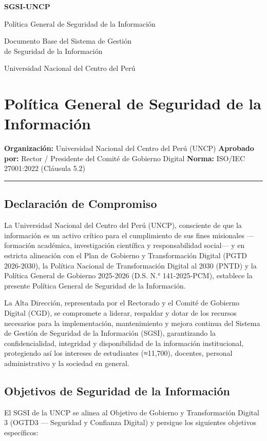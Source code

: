 \documentclass[10pt,letterpaper]{article}
\newcommand{\makecover}{
\begin{titlepage}
\centering
\vspace*{2cm}
{\Huge\bfseries\color{uncpblue} SGSI-UNCP\par}
\vspace{0.7cm}
{\LARGE Política General de Seguridad de la Información\par}
\vspace{0.5cm}
{\large Documento Base del Sistema de Gestión\\de Seguridad de la Información\par}
\vspace{1.5cm}
{\small Universidad Nacional del Centro del Perú\par}
\vfill
\end{titlepage}
}
\begin{document}
\makecover
\setcounter{tocdepth}{2}
\RaggedRight
\tableofcontents
\newpage

\RaggedRight
\section{Política General de Seguridad de la
Información}\label{poluxedtica-general-de-seguridad-de-la-informaciuxf3n}

\textbf{Organización:} Universidad Nacional del Centro del Perú (UNCP)
\textbf{Aprobado por:} Rector / Presidente del Comité de Gobierno
Digital \textbf{Norma:} ISO/IEC 27001:2022 (Cláusula 5.2)

\begin{center}\rule{0.5\linewidth}{0.5pt}\end{center}

\subsection{Declaración de
Compromiso}\label{declaraciuxf3n-de-compromiso}

La Universidad Nacional del Centro del Perú (UNCP), consciente de que la
información es un activo crítico para el cumplimiento de sus fines
misionales ---formación académica, investigación científica y
responsabilidad social--- y en estricta alineación con el Plan de
Gobierno y Transformación Digital (PGTD 2026-2030), la Política Nacional
de Transformación Digital al 2030 (PNTD) y la Política General de
Gobierno 2025-2026 (D.S. N.° 141-2025-PCM), establece la presente
Política General de Seguridad de la Información.

La Alta Dirección, representada por el Rectorado y el Comité de Gobierno
Digital (CGD), se compromete a liderar, respaldar y dotar de los
recursos necesarios para la implementación, mantenimiento y mejora
continua del Sistema de Gestión de Seguridad de la Información (SGSI),
garantizando la confidencialidad, integridad y disponibilidad de la
información institucional, protegiendo así los intereses de estudiantes
(≈11,700), docentes, personal administrativo y la sociedad en general.

\subsection{Objetivos de Seguridad de la
Información}\label{objetivos-de-seguridad-de-la-informaciuxf3n}

El SGSI de la UNCP se alinea al Objetivo de Gobierno y Transformación
Digital 3 (OGTD3 --- Seguridad y Confianza Digital) y persigue los
siguientes objetivos específicos:
\end{document}
